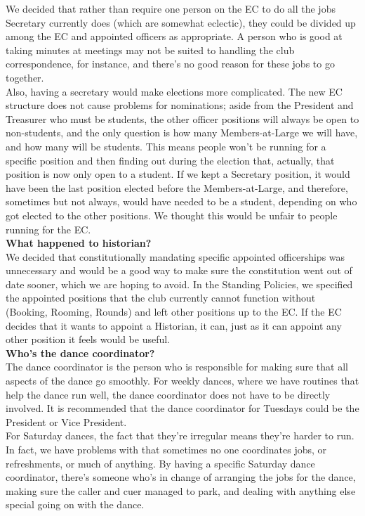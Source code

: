 \documentclass{article}
\begin{document}
  We decided that rather than require one person on the EC to do all the jobs Secretary currently does (which are somewhat eclectic), they could be divided up among the EC and appointed officers as appropriate. A person who is good at taking minutes at meetings may not be suited to handling the club correspondence, for instance, and there's no good reason for these jobs to go together. \\
  Also, having a secretary would make elections more complicated. The new EC structure does not cause problems for nominations; aside from the President and Treasurer who must be students, the other officer positions will always be open to non-students, and the only question is how many Members-at-Large we will have, and how many will be students. This means people won't be running for a specific position and then finding out during the election that, actually, that position is now only open to a student. If we kept a Secretary position, it would have been the last position elected before the Members-at-Large, and therefore, sometimes but not always, would have needed to be a student, depending on who got elected to the other positions. We thought this would be unfair to people running for the EC.\\\bigskip
  \textbf{What happened to historian?}\\\smallskip
  We decided that constitutionally mandating specific appointed officerships was unnecessary and would be a good way to make sure the constitution went out of date sooner, which we are hoping to avoid. In the Standing Policies, we specified the appointed positions that the club currently cannot function without (Booking, Rooming, Rounds) and left other positions up to the EC. If the EC decides that it wants to appoint a Historian, it can, just as it can appoint any other position it feels would be useful. \\\bigskip
  \textbf{Who's the dance coordinator?}\\\smallskip
  The dance coordinator is the person who is responsible for making sure that all aspects of the dance go smoothly. For weekly dances, where we have routines that help the dance run well, the dance coordinator does not have to be directly involved. It is recommended that the dance coordinator for Tuesdays could be the President or Vice President. \\
  For Saturday dances, the fact that they're irregular means they're harder to run. In fact, we have problems with that sometimes no one coordinates jobs, or refreshments, or much of anything. By having a specific Saturday dance coordinator, there's someone who's in change of arranging the jobs for the dance, making sure the caller and cuer managed to park, and dealing with anything else special going on with the dance. \\\bigskip
\end{document}
